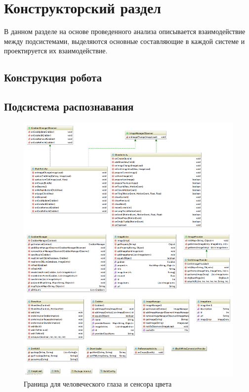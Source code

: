 \chapter{Конструкторский раздел}
\label{cha:design}

В данном разделе на основе проведенного анализа описывается взаимодействие между подсистемами, выделяются основные составляющие в каждой системе и проектируется их взаимодействие.

\section{Конструкция робота}


\section{Подсистема распознавания}

\begin{figure}
  \centering
  \includegraphics[width=\textwidth]{inc/raster/design2-1.png}
  \caption{Граница для человеческого глаза и сенсора цвета}
  \label{fig:fig21}
\end{figure}